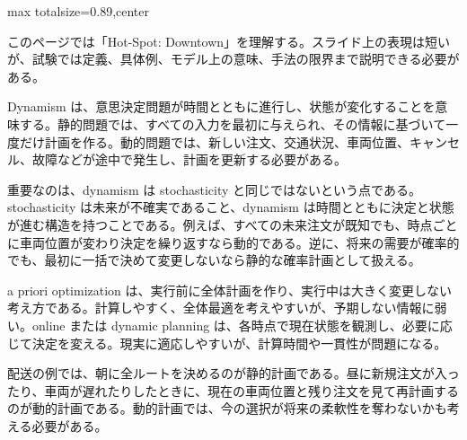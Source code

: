 \begin{minipage}[t]{0.58\textwidth}
\begin{adjustbox}{max totalsize={\textwidth}{0.89\textheight},center}
\begin{minipage}{\textwidth}\scriptsize
{}このページでは「Hot-Spot: Downtown」を理解する。スライド上の表現は短いが、試験では定義、具体例、モデル上の意味、手法の限界まで説明できる必要がある。\par
Dynamism は、意思決定問題が時間とともに進行し、状態が変化することを意味する。静的問題では、すべての入力を最初に与えられ、その情報に基づいて一度だけ計画を作る。動的問題では、新しい注文、交通状況、車両位置、キャンセル、故障などが途中で発生し、計画を更新する必要がある。\par
重要なのは、dynamism は stochasticity と同じではないという点である。stochasticity は未来が不確実であること、dynamism は時間とともに決定と状態が進む構造を持つことである。例えば、すべての未来注文が既知でも、時点ごとに車両位置が変わり決定を繰り返すなら動的である。逆に、将来の需要が確率的でも、最初に一括で決めて変更しないなら静的な確率計画として扱える。\par
a priori optimization は、実行前に全体計画を作り、実行中は大きく変更しない考え方である。計算しやすく、全体最適を考えやすいが、予期しない情報に弱い。online または dynamic planning は、各時点で現在状態を観測し、必要に応じて決定を変える。現実に適応しやすいが、計算時間や一貫性が問題になる。\par
配送の例では、朝に全ルートを決めるのが静的計画である。昼に新規注文が入ったり、車両が遅れたりしたときに、現在の車両位置と残り注文を見て再計画するのが動的計画である。動的計画では、今の選択が将来の柔軟性を奪わないかも考える必要がある。\par

\end{minipage}
\end{adjustbox}
\end{minipage}
